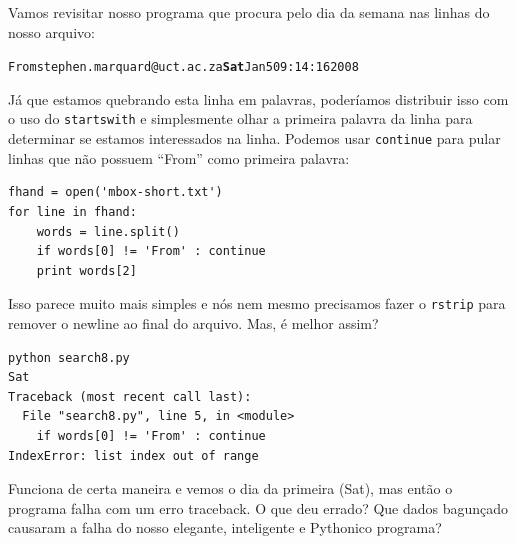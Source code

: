\begin{enumerate}
Vamos revisitar nosso programa que procura pelo dia da semana
nas linhas do nosso arquivo:


\beforeverb
\begin{alltt}
From stephen.marquard@uct.ac.za {\bf Sat} Jan  5 09:14:16 2008
\end{alltt}
\afterverb

Já que estamos quebrando esta linha em palavras, poderíamos distribuir
isso com o uso do {\tt startswith} e simplesmente olhar a primeira palavra
da linha para determinar se estamos interessados na linha. Podemos usar {\tt continue} 
para pular linhas que não possuem ``From'' como primeira palavra:



\beforeverb
\begin{verbatim}
fhand = open('mbox-short.txt')
for line in fhand:
    words = line.split()
    if words[0] != 'From' : continue
    print words[2]
\end{verbatim}
\afterverb
%
Isso parece muito mais simples e nós nem mesmo precisamos fazer o
{\tt rstrip} para remover o newline ao final do arquivo.
Mas, é melhor assim?

\beforeverb
\begin{verbatim}
python search8.py 
Sat
Traceback (most recent call last):
  File "search8.py", line 5, in <module>
    if words[0] != 'From' : continue
IndexError: list index out of range
\end{verbatim}
\afterverb
%
Funciona de certa maneira e vemos o dia da primeira
(Sat), mas então o programa falha com um erro traceback.
O que deu errado? Que dados bagunçado causaram a falha do
nosso elegante, inteligente e Pythonico programa?



\end{enumerate}
